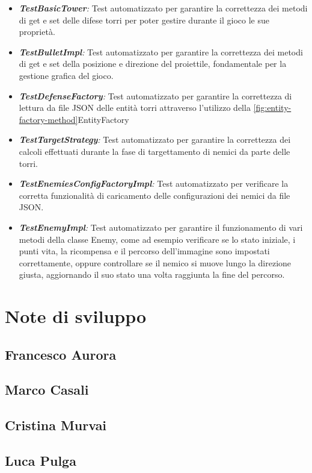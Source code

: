 \documentclass[a4paper,12pt]{report}
\begin{document}
\begin{itemize}
    \item \textit{\textbf{TestBasicTower}:} Test automatizzato per garantire la correttezza dei metodi di get e set delle difese torri per poter gestire durante il gioco le sue proprietà.
    \item \textit{\textbf{TestBulletImpl}:} Test automatizzato per garantire la correttezza dei metodi di get e set della posizione e direzione del proiettile, fondamentale per la gestione grafica del gioco.
    \item \textit{\textbf{TestDefenseFactory}:} Test automatizzato per garantire la correttezza di lettura da file JSON delle entità torri attraverso l'utilizzo della \ref{fig:entity-factory-method}EntityFactory
    \item \textit{\textbf{TestTargetStrategy}:} Test automatizzato per garantire la correttezza dei calcoli effettuati durante la fase di targettamento di nemici da parte delle torri.
    \item \textit{\textbf{TestEnemiesConfigFactoryImpl}:} Test automatizzato per verificare la corretta funzionalità di caricamento delle configurazioni dei nemici da file JSON.
    \item \textit{\textbf{TestEnemyImpl}:} Test automatizzato per garantire il funzionamento di vari metodi della classe Enemy, come ad esempio verificare se lo stato iniziale, i punti vita, la ricompensa e il percorso dell'immagine sono impostati correttamente, oppure controllare se il nemico si muove lungo la direzione giusta,  aggiornando il suo stato una volta raggiunta la fine del percorso. 
\end{itemize}

\section{Note di sviluppo}

\subsection{Francesco Aurora}
\subsection{Marco Casali}
\subsection{Cristina Murvai}
\subsection{Luca Pulga}
\end{document}
